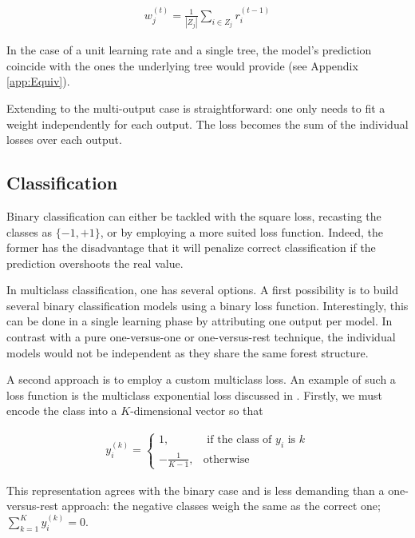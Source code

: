 \documentclass{article}
\begin{document}
\begin{align}\label{eq:L2Solution}
w_j^{(t)} = \frac{1}{|Z_j|} \sum_{i \in Z_j} r_i^{(t-1)}
\end{align}

In the case of a unit learning rate and a single tree, the model's prediction 
coincide with the ones the underlying tree would provide (see Appendix 
\ref{app:Equiv}).

Extending to the multi-output case is straightforward: one only needs to fit a 
weight independently for each output. The loss becomes the sum of the 
individual losses over each output.

\subsection{Classification}
\label{subsec:classification}

Binary classification can either be tackled with the square loss, recasting the 
classes as $\{-1, +1\}$, or by employing a more suited loss function. Indeed, 
the former has the disadvantage that it will penalize correct classification if 
the prediction overshoots the real value.

In multiclass classification, one has several options. A first possibility is 
to build several binary classification models using a binary loss function. 
Interestingly, this can be done in a single learning phase by attributing one 
output per model. In contrast with a pure one-versus-one or one-versus-rest 
technique, the individual models would not be independent as they share the 
same forest structure.

A second approach is to employ a custom multiclass loss. An example of such a 
loss function is the multiclass exponential loss discussed in 
\citet{zhu2009multiadaboost}. Firstly, we must encode the class into a 
$K$-dimensional vector so that


\begin{align}\label{eq:MEencode}
y_i^{(k)} = \begin{cases}
1, &\text{ if the class of } y_i \text{ is } k \\
-\frac{1}{K-1}, &\text{otherwise}
\end{cases}
\end{align}

This representation agrees with the binary case and is less demanding than a 
one-versus-rest approach: the negative classes weigh the same as the correct 
one; $\sum_{k=1}^{K} y_i^{(k)} = 0$.
\end{document}
